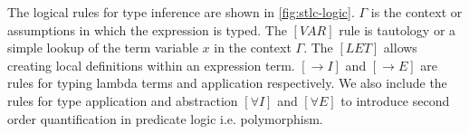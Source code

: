The logical rules for type inference are shown in \ref{fig:stlc-logic}. $\Gamma$ is the
context or assumptions in which the expression is typed. The $[VAR]$ rule is tautology or a simple
lookup of the term variable $x$ in the context $\Gamma$. The $[LET]$ allows creating local
definitions within an expression term. $[\rightarrow I]$ and $[\rightarrow E]$ are rules
for typing lambda terms and application respectively. We also include the rules for
type application and abstraction $[\forall I]$ and $[\forall E]$ to introduce second order
quantification in predicate logic i.e. polymorphism.


